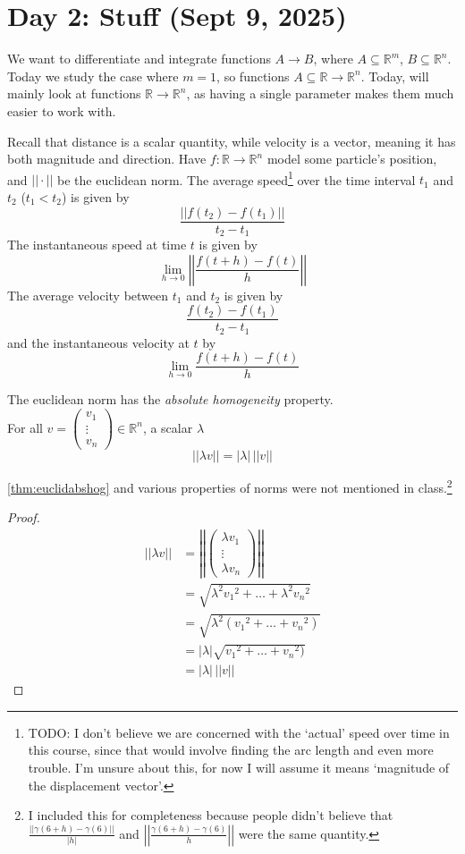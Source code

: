 \section{Day 2: Stuff (Sept 9, 2025)}

We want to differentiate and integrate functions $A \to B$, where $A \subseteq \mathbb{R}^m$, $B \subseteq \mathbb{R}^n$. Today we study the case where $m = 1$, so functions $A \subseteq \mathbb{R} \to \mathbb{R}^n$. Today, will mainly look at functions $\mathbb{R} \to \mathbb{R}^n$, as having a single parameter makes them much easier to work with.

Recall that distance is a scalar quantity, while velocity is a vector, meaning it has both magnitude and direction. Have $f: \mathbb{R} \to \mathbb{R}^n$ model some particle's position, and $||\cdot||$ be the euclidean norm. The average speed\footnote{TODO: I don't believe we are concerned with the `actual' speed over time in this course, since that would involve finding the arc length and even more trouble. I'm unsure about this, for now I will assume it means `magnitude of the displacement vector'.} over the time interval $t_1$ and $t_2$ ($t_1 < t_2$) is given by
\[
\frac{||f(t_2) - f(t_1)||}{t_2-t_1}
\]
The instantaneous speed at time $t$ is given by
\[
\lim_{ h \to 0 } \left|\left|\frac{f(t + h) - f(t)}{h} \right|\right|
\]
The average velocity between $t_1$ and $t_2$ is given by
\[
\frac{f(t_2) - f(t_1)}{t_2 - t_1}
\]
and the instantaneous velocity at $t$ by
\[
\lim_{ h \to 0 } \frac{f(t + h) - f(t)}{h}
\]
\begin{theorem} \label{thm:euclidabshog}
The euclidean norm has the \textit{absolute homogeneity} property. \\
    For all $v = \begin{pmatrix}
v_1 \\ \vdots \\ v_n
\end{pmatrix} \in \mathbb{R}^n$, a scalar $\lambda$
\[
|| \lambda v || = |\lambda| \, ||v||
\]
\end{theorem}
\ref{thm:euclidabshog} and various properties of norms were not mentioned in class.\footnote{I included this for completeness because people didn't believe that $\frac{||\gamma(6 + h) - \gamma(6)||}{|h|}$ and $\left|\left| \frac{\gamma(6 + h) - \gamma(6)}{h} \right|\right|$ were the same quantity.}
\begin{proof}

\begin{align*}
    ||\lambda v|| &= \left|\left|\begin{pmatrix}
\lambda v_1 \\ \vdots \\ \lambda v_n
\end{pmatrix} \right|\right| \\
    &= \sqrt{\lambda^2 {v_1}^2 + \dots + \lambda^2 {v_n}^2} \\
    &= \sqrt{\lambda^2 ({v_1}^2 + \dots + {v_n}^2)} \\
    &= |\lambda| \sqrt{{v_1}^2 + \dots + {v_n}^2)} \\
    &= |\lambda| \, ||v||
\end{align*}

\end{proof}
